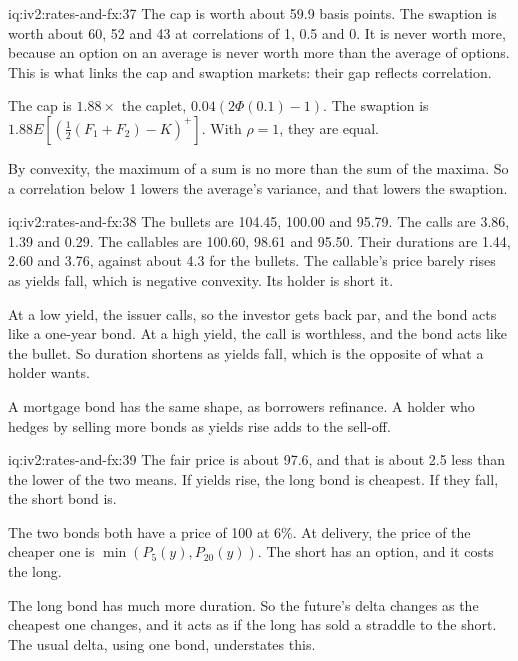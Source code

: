\begin{solution}{iq:iv2:rates-and-fx:37}
The cap is worth about 59.9 basis points. The swaption is worth about 60, 52 and 43 at correlations of 1, 0.5 and 0. It is never worth more, because an option on an average is never worth more than the average of options. This is what links the cap and swaption markets: their gap reflects correlation.

The cap is $1.88 \times$ the caplet, $0.04(2\Phi(0.1) - 1)$. The swaption is $1.88E[(\tfrac12(F_1 + F_2) - K)^+]$. With $\rho = 1$, they are equal.

By convexity, the maximum of a sum is no more than the sum of the maxima. So a correlation below 1 lowers the average's variance, and that lowers the swaption.

\end{solution}

\begin{solution}{iq:iv2:rates-and-fx:38}
The bullets are 104.45, 100.00 and 95.79. The calls are 3.86, 1.39 and 0.29. The callables are 100.60, 98.61 and 95.50. Their durations are 1.44, 2.60 and 3.76, against about 4.3 for the bullets. The callable's price barely rises as yields fall, which is negative convexity. Its holder is short it.

At a low yield, the issuer calls, so the investor gets back par, and the bond acts like a one-year bond. At a high yield, the call is worthless, and the bond acts like the bullet. So duration shortens as yields fall, which is the opposite of what a holder wants.

A mortgage bond has the same shape, as borrowers refinance. A holder who hedges by selling more bonds as yields rise adds to the sell-off.

\end{solution}

\begin{solution}{iq:iv2:rates-and-fx:39}
The fair price is about 97.6, and that is about 2.5 less than the lower of the two means. If yields rise, the long bond is cheapest. If they fall, the short bond is.

The two bonds both have a price of 100 at 6\%. At delivery, the price of the cheaper one is $\min(P_5(y), P_{20}(y))$. The short has an option, and it costs the long.

The long bond has much more duration. So the future's delta changes as the cheapest one changes, and it acts as if the long has sold a straddle to the short. The usual delta, using one bond, understates this.

\end{solution}

